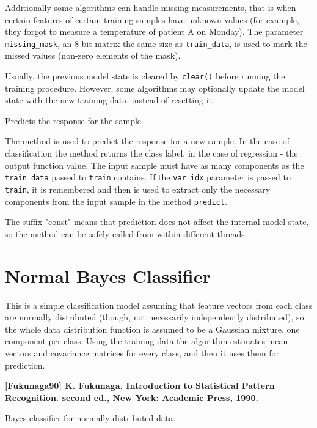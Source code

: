 Additionally some algorithms can handle missing measurements, that is when certain features of certain training samples have unknown values (for example, they forgot to measure a temperature of patient A on Monday). The parameter \texttt{missing\_mask}, an 8-bit matrix the same size as \texttt{train\_data}, is used to mark the missed values (non-zero elements of the mask).

Usually, the previous model state is cleared by \texttt{clear()} before running the training procedure. However, some algorithms may optionally update the model state with the new training data, instead of resetting it.


Predicts the response for the sample.


The method is used to predict the response for a new sample. In the case of classification the method returns the class label, in the case of regression - the output function value. The input sample must have as many components as the \texttt{train\_data} passed to \texttt{train} contains. If the \texttt{var\_idx} parameter is passed to \texttt{train}, it is remembered and then is used to extract only the necessary components from the input sample in the method \texttt{predict}.

The suffix "const" means that prediction does not affect the internal model state, so the method can be safely called from within different threads.

\section{Normal Bayes Classifier}

This is a simple classification model assuming that feature vectors from each class are normally distributed (though, not necessarily independently distributed), so the whole data distribution function is assumed to be a Gaussian mixture, one component per  class. Using the training data the algorithm estimates mean vectors and covariance matrices for every class, and then it uses them for prediction.

\textbf{[Fukunaga90] K. Fukunaga. Introduction to Statistical Pattern Recognition. second ed., New York: Academic Press, 1990.}



Bayes classifier for normally distributed data.

